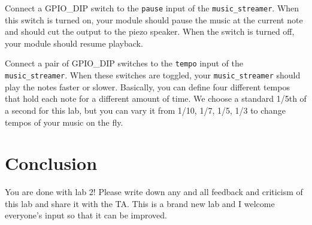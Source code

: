 \documentclass[11pt]{article}
\begin{document}
Connect a GPIO\_DIP switch to the \verb|pause| input of the \verb|music_streamer|. When this switch is turned on, your module should pause the music at the current note and should cut the output to the piezo speaker. When the switch is turned off, your module should resume playback.

Connect a pair of GPIO\_DIP switches to the \verb|tempo| input of the \verb|music_streamer|. When these switches are toggled, your \verb|music_streamer| should play the notes faster or slower. Basically, you can define four different tempos that hold each note for a different amount of time. We choose a standard 1/5th of a second for this lab, but you can vary it from 1/10, 1/7, 1/5, 1/3 to change tempos of your music on the fly.

\section{Conclusion}
You are done with lab 2! Please write down any and all feedback and criticism of this lab and share it with the TA. This is a brand new lab and I welcome everyone's input so that it can be improved.
\end{document}
